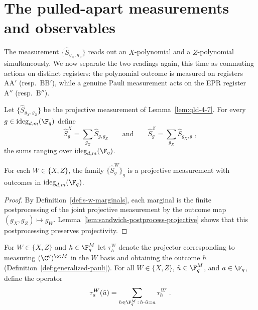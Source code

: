 \section{The pulled-apart measurements and observables}

The measurement $\{\hat{S}_{g_X,g_Z}\}$ reads out an $X$-polynomial and a $Z$-polynomial simultaneously. We now separate the two readings again, this time as commuting actions on distinct registers: the polynomial outcome is measured on registers $\mathrm{A}\mathrm{A}'$ (resp.\ $\mathrm{B}\mathrm{B}'$), while a genuine Pauli measurement acts on the EPR register $\mathrm{A}''$ (resp.\ $\mathrm{B}''$).

\begin{definition}\label{def:s-w-marginals}
	\leanok
	Let $\{\hat{S}_{g_X,g_Z}\}$ be the projective measurement of Lemma~\ref{lem:qld-4-7}. For every $g \in \mathrm{ideg}_{d,m}(\F_q)$ define
	\[
		\hat{S}^X_g = \sum_{g_Z} \hat{S}_{g,g_Z}
		\qquad \text{and} \qquad
		\hat{S}^Z_g = \sum_{g_X} \hat{S}_{g_X,g}\;,
	\]
	the sums ranging over $\mathrm{ideg}_{d,m}(\F_q)$.
\end{definition}

\begin{lemma}\label{lem:s-w-marginals-projective}
	\leanok
	For each $W\in\{X,Z\}$, the family $\{\hat{S}^W_g\}_g$ is a projective measurement with outcomes in $\mathrm{ideg}_{d,m}(\F_q)$.
\end{lemma}
\begin{proof}
	\leanok
	By Definition~\ref{def:s-w-marginals}, each marginal is the finite postprocessing
	of the joint projective measurement by the outcome map $(g_X,g_Z)\mapsto g_W$.
	Lemma~\ref{lem:sandwich-postprocess-projective} shows that this postprocessing
	preserves projectivity.
\end{proof}

\begin{definition}\label{def:tau-dot-product-projector}
	\leanok
	For $W \in \{X,Z\}$ and $h \in \F_q^{M}$ let $\tau^W_h$ denote the projector corresponding to measuring $(\C^q)^{\ot M}$ in the $W$ basis and obtaining the outcome $h$ (Definition~\ref{def:generalized-pauli}). For all $W \in \{X,Z\}$, $\tilde{u} \in \F_q^{M}$, and $a \in \F_q$, define the operator
	\begin{equation}\label{eq:def-tauwu}
		\tau^{W}_{a}(\tilde{u}) = \sum_{h \in \F_q^{M} \,:\, h \cdot \tilde{u} = a} \tau^W_{h}\;.
	\end{equation}
\end{definition}

